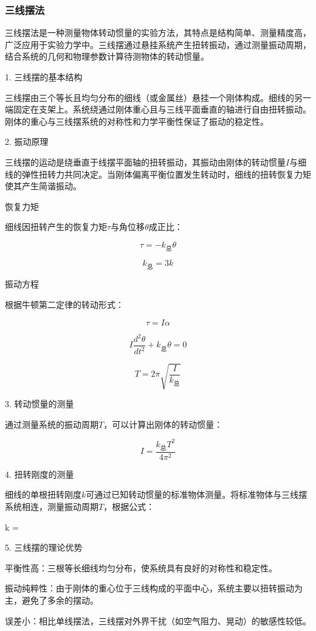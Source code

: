 \documentclass[12pt,hyperref,a4paper,UTF8]{ctexart}
\begin{document}
\subsubsection{三线摆法}

三线摆法是一种测量物体转动惯量的实验方法，其特点是结构简单、测量精度高，广泛应用于实验力学中。三线摆通过悬挂系统产生扭转振动，通过测量振动周期，结合系统的几何和物理参数计算待测物体的转动惯量。

1. 三线摆的基本结构

三线摆由三个等长且均匀分布的细线（或金属丝）悬挂一个刚体构成。细线的另一端固定在支架上。系统绕通过刚体重心且与三线平面垂直的轴进行自由扭转振动。刚体的重心与三线摆系统的对称性和力学平衡性保证了振动的稳定性。

2. 振动原理

三线摆的运动是绕垂直于线摆平面轴的扭转振动，其振动由刚体的转动惯量$I$与细线的弹性扭转力共同决定。当刚体偏离平衡位置发生转动时，细线的扭转恢复力矩使其产生简谐振动。

恢复力矩

细线因扭转产生的恢复力矩$\tau$与角位移$\theta$成正比：

$$ \tau = -k_{\text{总}} \theta $$

$$ k_{\text{总}} = 3k $$

振动方程

根据牛顿第二定律的转动形式：

$$ \tau = I \alpha $$

$$ I \frac{d^2\theta}{dt^2} + k_{\text{总}} \theta = 0 $$

$$ T = 2\pi \sqrt{\frac{I}{k_{\text{总}}}} $$

3. 转动惯量的测量

通过测量系统的振动周期$T$，可以计算出刚体的转动惯量：

$$ I = \frac{k_{\text{总}} T^2}{4\pi^2} $$

4. 扭转刚度的测量

细线的单根扭转刚度$k$可通过已知转动惯量的标准物体测量。将标准物体与三线摆系统相连，测量振动周期$T$，根据公式：

k = 

5. 三线摆的理论优势

平衡性高：三根等长细线均匀分布，使系统具有良好的对称性和稳定性。

振动纯粹性：由于刚体的重心位于三线构成的平面中心，系统主要以扭转振动为主，避免了多余的摆动。

误差小：相比单线摆法，三线摆对外界干扰（如空气阻力、晃动）的敏感性较低。
\end{document}

